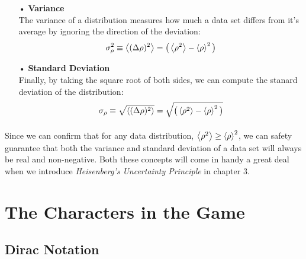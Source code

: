 \documentclass[12pt,letterpaper]{book}
\begin{document}
\begin{enumerate}
\item[•]\textbf{Variance}\\
The variance of a distribution measures how much a data set differs from it's average by ignoring the direction of the deviation:
\begin{equation}
\label{variance}
\sigma_{\rho}^2 \equiv \expval{(\Delta \rho)^2} = \big( \expval{\rho^2} - \expval{\rho}^2 \big)
\end{equation}
\item[•]\textbf{Standard Deviation}\\
Finally, by taking the square root of both sides, we can compute the stanard deviation of the distribution:
\begin{equation}
\label{std dev}
\sigma_{\rho} \equiv \sqrt{\expval{(\Delta \rho)^2}} = \sqrt{\big( \expval{\rho^2} - \expval{\rho}^2 \big)}
\end{equation}
\end{enumerate}
\paragraph*{}Since we can confirm that for any data distribution, $\expval{\rho^2} \geq \expval{\rho}^2$, we can safety guarantee that both the variance and standard deviation of a data set will always be real and non-negative. Both these concepts will come in handy a great deal when we introduce \textit{Heisenberg's Uncertainty Principle} in chapter 3.


\section{The Characters in the Game}


\subsection*{Dirac Notation}
\end{document}
